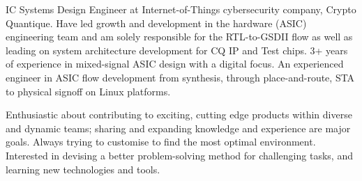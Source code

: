 

\begin{cvparagraph}
IC Systems Design Engineer at Internet-of-Things cybersecurity company, Crypto Quantique. Have led growth and development in the hardware (ASIC) engineering team and am solely responsible for the RTL-to-GSDII flow as well as leading on system architecture development for CQ IP and Test chips. 3+ years of experience in mixed-signal ASIC design with a digital focus. An experienced engineer in ASIC flow development from synthesis, through place-and-route, STA to physical signoff on Linux platforms.

Enthusiastic about contributing to exciting, cutting edge products within diverse and dynamic teams; sharing and expanding knowledge and experience are major goals. Always trying to customise to find the most optimal environment. Interested in devising a better problem-solving method for challenging tasks, and learning new technologies and tools.
\end{cvparagraph}
